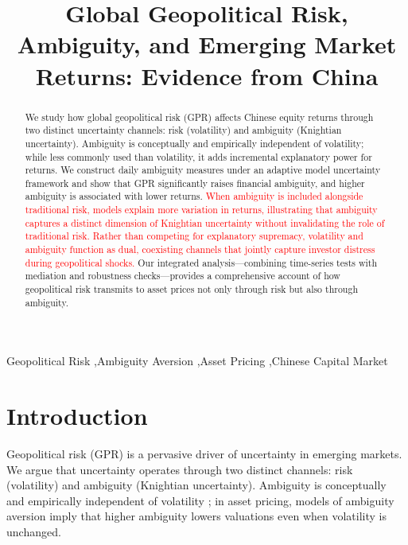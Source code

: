 \documentclass[preprint,12pt,authoryear]{elsarticle}
\begin{document}
\begin{frontmatter}

\title{Global Geopolitical Risk, Ambiguity, and Emerging Market Returns: Evidence from China}

\begin{abstract}
We study how global geopolitical risk (GPR) affects Chinese equity returns through two distinct uncertainty channels: risk (volatility) and ambiguity (Knightian uncertainty). Ambiguity is conceptually and empirically independent of volatility; while less commonly used than volatility, it adds incremental explanatory power for returns. We construct daily ambiguity measures under an adaptive model uncertainty framework and show that GPR significantly raises financial ambiguity, and higher ambiguity is associated with lower returns. \textcolor{red}{When ambiguity is included alongside traditional risk, models explain more variation in returns, illustrating that ambiguity captures a distinct dimension of Knightian uncertainty without invalidating the role of traditional risk. Rather than competing for explanatory supremacy, volatility and ambiguity function as dual, coexisting channels that jointly capture investor distress during geopolitical shocks.} Our integrated analysis—combining time-series tests with mediation and robustness checks—provides a comprehensive account of how geopolitical risk transmits to asset prices not only through risk but also through ambiguity.
\end{abstract}

\begin{keyword}
Geopolitical Risk \sep Ambiguity Aversion \sep Asset Pricing \sep Chinese Capital Market 
\end{keyword}

\end{frontmatter}

\section{Introduction}

Geopolitical risk (GPR) is a pervasive driver of uncertainty in emerging markets. We argue that uncertainty operates through two distinct channels: risk (volatility) and ambiguity (Knightian uncertainty). Ambiguity is conceptually and empirically independent of volatility \citep{Knight1921, Ellsberg1961}; in asset pricing, models of ambiguity aversion \citep{Gilboa1989, Klibanoff2005} imply that higher ambiguity lowers valuations even when volatility is unchanged.
\end{document}
